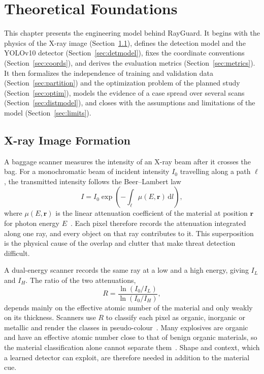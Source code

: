 \chapter{Theoretical Foundations}\label{ch:theory}
This chapter presents the engineering model behind RayGuard. It begins with the
physics of the X-ray image (Section~\ref{sec:xray}), defines the detection model
and the YOLOv10 detector (Section~\ref{sec:detmodel}), fixes the coordinate
conventions (Section~\ref{sec:coords}), and derives the evaluation metrics
(Section~\ref{sec:metrics}). It then formalizes the independence of training and
validation data (Section~\ref{sec:partition}) and the optimization problem of the
planned study (Section~\ref{sec:optim}), models the evidence of a case spread over
several scans (Section~\ref{sec:distmodel}), and closes with the assumptions and
limitations of the model (Section~\ref{sec:limits}).

\section{X-ray Image Formation}\label{sec:xray}
A baggage scanner measures the intensity of an X-ray beam after it crosses the
bag. For a monochromatic beam of incident intensity $I_0$ travelling along a
path $\ell$, the transmitted intensity follows the Beer--Lambert law
\begin{equation}
 I = I_0 \exp\!\left(-\int_{\ell} \mu(E,\mathbf{r})\,\mathrm{d}l\right),
\end{equation}
where $\mu(E,\mathbf{r})$ is the linear attenuation coefficient of the material at
position $\mathbf{r}$ for photon energy $E$~\citep{wells2012review}. Each pixel
therefore records the attenuation integrated along one ray, and every object on
that ray contributes to it. This superposition is the physical cause of the
overlap and clutter that make threat detection difficult.

A dual-energy scanner records the same ray at a low and a high energy, giving
$I_L$ and $I_H$. The ratio of the two attenuations,
\begin{equation}
 R = \frac{\ln(I_0/I_L)}{\ln(I_0/I_H)},
\end{equation}
depends mainly on the effective atomic number of the material and only weakly on
its thickness. Scanners use $R$ to classify each pixel as organic, inorganic or
metallic and render the classes in pseudo-colour~\citep{wells2012review}. Many
explosives are organic and have an effective atomic number close to that of
benign organic materials, so the material classification alone cannot separate
them~\citep{takele2026iedxray}. Shape and context, which a learned detector can
exploit, are therefore needed in addition to the material cue.


